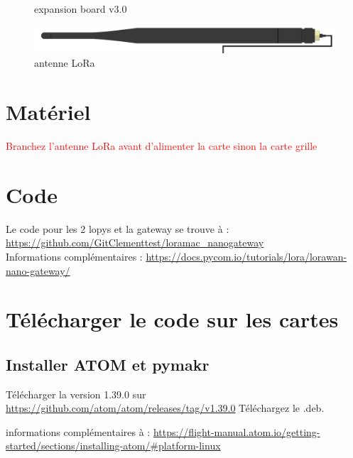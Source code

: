 \documentclass{article}
\begin{document}
\begin{figure}[H]
\begin{minipage}[b]{0.4\textwidth}
    \caption{expansion board v3.0}
  \end{minipage}
\end{figure}

    \begin{figure}[H]
\begin{center}
\advance\leftskip-3cm
\advance\rightskip-3cm
\includegraphics[keepaspectratio=true,scale=0.2]{lora_antenna.png}
\caption{antenne LoRa}
\label{visina8}
\end{center}\end{figure}



\section{Matériel}
\textcolor{red}{Branchez l'antenne LoRa avant d'alimenter la carte sinon la carte grille}

\section{Code}

Le code pour les 2 lopys et la gateway se trouve à : \url{https://github.com/GitClementtest/loramac_nanogateway}\\
Informations complémentaires : \url{https://docs.pycom.io/tutorials/lora/lorawan-nano-gateway/} 

\section{Télécharger le code sur les cartes}
\subsection{Installer ATOM et pymakr}

Télécharger la version 1.39.0 sur \url{https://github.com/atom/atom/releases/tag/v1.39.0}
Téléchargez le .deb. \\

informations complémentaires à : \url{https://flight-manual.atom.io/getting-started/sections/installing-atom/#platform-linux}
\end{document}
